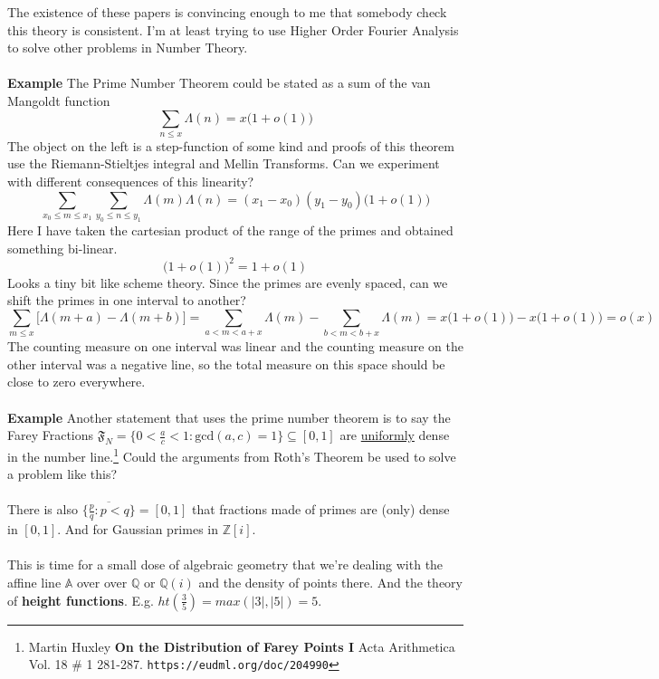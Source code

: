 \documentclass[12pt]{article}
\begin{document}
The existence of these papers is convincing enough to me that somebody check this theory is consistent.  I'm at least trying to use Higher Order Fourier Analysis to solve other problems in Number Theory. \\ \\
\textbf{Example} The Prime Number Theorem could be stated as a sum of the van Mangoldt function
$$ \sum_{n \leq x} \Lambda (n) =  x \big(1 + o(1)\big) $$
The object on the left is a step-function of some kind and proofs of this theorem use the Riemann-Stieltjes integral and Mellin Transforms.  Can we experiment with different consequences of this linearity?
$$ \sum_{x_0 \leq m \leq x_1} \sum_{y_0 \leq n \leq y_1} \Lambda(m)\Lambda (n) =  (x_1 - x_0)(y_1 - y_0) \big(1 + o(1)\big) $$
Here I have taken the cartesian product of the range of the primes and obtained something bi-linear.
$$ \big(1 + o(1)\big)^2 = 1 + o(1) $$
Looks a tiny bit like scheme theory.  Since the primes are evenly spaced, can we shift the primes in one interval to another?
$$ \sum_{m \leq x} \Big[ \Lambda(m+a) - \Lambda(m+b) \Big] = \sum_{a < m < a + x}\Lambda(m) - \sum_{b < m < b + x}\Lambda(m) = x \big( 1 + o(1) \big) - x \big( 1 + o(1) \big) = o(x)$$
The counting measure on one interval was linear and the counting measure on the other interval was a negative line, so the total measure on this space should be close to zero everywhere. \\ \\
\textbf{Example} Another statement that uses the prime number theorem is to say the Farey Fractions $\mathfrak{F}_N = \{ 0 < \frac{a}{c} < 1 : \text{gcd}(a,c) = 1 \} \subseteq [0,1]$ are \underline{uniformly} dense in the number line.\footnote{Martin Huxley \textbf{On the Distribution of Farey Points I} Acta Arithmetica Vol. 18 \# 1 281-287. \texttt{https://eudml.org/doc/204990} } Could the arguments from Roth's Theorem be used to solve a problem like this? \\ \\
There is also $\overline{\{ \frac{p}{q}: p < q \}} = [0,1]$ that fractions made of primes are (only) dense in $[0,1]$. And for Gaussian primes in $\mathbb{Z}[i]$. \\ \\
This is time for a small dose of algebraic geometry that we're dealing with the affine line $\mathbb{A}$ over over $\mathbb{Q}$ or $\mathbb{Q}(i)$ and the density of points there.  And the theory of \textbf{height functions}.  E.g. $ht(\frac{3}{5}) = max(|3|,|5|) = 5$.
\vfill
\end{document}
